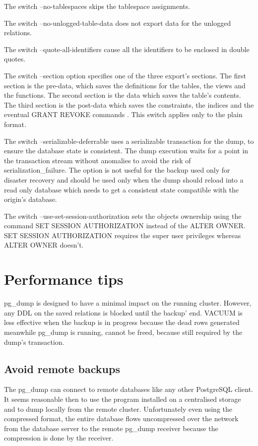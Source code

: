 The switch --no-tablespaces skips the tablespace assignments.\newline

The switch  --no-unlogged-table-data does not export data for the unlogged relations.\newline

The switch  --quote-all-identifiers  cause all the identifiers to be enclosed in double quotes. \newline

The switch --section option specifies one of the three export's sections. The first section is the 
pre-data, which saves the definitions for the tables, the views and the functions. The second section is the 
data which saves the table's contents. The third section is the post-data which saves the constraints, the 
indices and the eventual GRANT REVOKE commands . This switch applies only to the plain format. \newline

The switch --serializable-deferrable uses a serializable transaction for the dump, to ensure the database 
state is consistent. The dump execution waits for a point in the transaction stream without 
anomalies to avoid the risk of serialization\_failure. The option is not useful for the backup used 
only for disaster recovery and should be used only when the dump should reload into a read only database 
which needs to get a consistent state compatible with the origin's database.\newline

The switch --use-set-session-authorization sets the objects ownership using the command SET SESSION 
AUTHORIZATION instead of the ALTER OWNER. SET SESSION AUTHORIZATION requires the super user privileges 
whereas ALTER OWNER doesn't.


\section{Performance tips}
pg\_dump is designed to have a minimal impact on the running cluster.  However, any DDL on the saved 
relations is blocked until the backup' end. VACUUM is less effective when the backup is in progress because 
the dead rows generated meanwhile pg\_dump is running, cannot be freed, because still required by the 
dump's transaction.\newline

\subsection{Avoid remote backups}
The pg\_dump can connect to remote databases like any other PostgreSQL client. It seems reasonable then to 
use the program installed on a centralised storage and to dump locally from the remote cluster. 
Unfortunately even using the compressed format, the entire database flows uncompressed over the network 
from the database server to the remote pg\_dump receiver because the compression is done by the 
receiver.\newline

